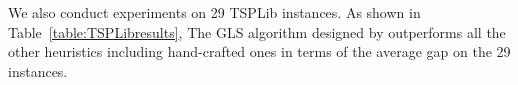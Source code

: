We also conduct experiments on 29 TSPLib instances.
As shown in Table~\ref{table:TSPLibresults}, The GLS algorithm designed by \ourmethod{} outperforms all the other heuristics including hand-crafted ones in terms of the average gap on the 29 instances. 


